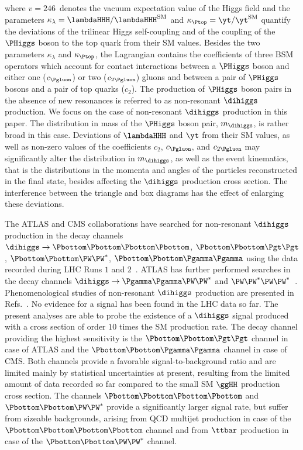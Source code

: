 where $v = 246$~\GeV denotes the vacuum expectation value of the Higgs field
and the parameters $\kappa_{\lambda} = \lambdaHHH/\lambdaHHH^{\textrm{SM}}$ and $\kappa_{\Ptop} = \yt/\yt^{\textrm{SM}}$ 
quantify the deviations of the trilinear Higgs self-coupling and of the coupling of the $\PHiggs$ boson to the top quark from their SM values.
Besides the two parameters $\kappa_{\lambda}$ and $\kappa_{\Ptop}$,
the Lagrangian contains the coefficients of three BSM operators which account for contact interactions 
between a $\PHiggs$ boson and either one ($c_{\Pgluon}$) or two ($c_{2\Pgluon}$) gluons
and between a pair of $\PHiggs$ bosons and a pair of top quarks ($c_{2}$).
The production of $\PHiggs$ boson pairs in the absence of new resonances is referred to as non-resonant $\dihiggs$ production.
We focus on the case of non-resonant $\dihiggs$ production in this paper.
The distribution in mass of the $\PHiggs$ boson pair, $m_{\dihiggs}$, is rather broad in this case.
Deviations of $\lambdaHHH$ and $\yt$ from their SM values,
as well as non-zero values of the coefficients $c_{2}$, $c_{\Pgluon}$, and $c_{2\Pgluon}$
may significantly alter the distribution in $m_{\dihiggs}$,
as well as the event kinematics,
that is the distributions in the momenta and angles of the particles reconstructed in the final state,
besides affecting the $\dihiggs$ production cross section.
The interference between the triangle and box diagrams has the effect of enlarging these deviations.

The ATLAS and CMS collaborations have searched for non-resonant $\dihiggs$ production in the decay channels 
$\dihiggs \to \Pbottom\Pbottom\Pbottom\Pbottom$, $\Pbottom\Pbottom\Pgt\Pgt$, $\Pbottom\Pbottom\PW\PW^{*}$, $\Pbottom\Pbottom\Pgamma\Pgamma$
using the data recorded during LHC Runs $1$ and $2$~\cite{HIG-13-032,HIG-15-013,HIG-17-030,Aad:2015xja,Aaboud:2018knk,Aaboud:2018ftw,Aaboud:2018sfw,Aaboud:2018zhh}.
ATLAS has further performed searches in the decay channels $\dihiggs \to \Pgamma\Pgamma\PW\PW^{*}$ and $\PW\PW^{*}\PW\PW^{*}$~\cite{Aad:2015xja,Aaboud:2018ewm,Aaboud:2018ksn}.
Phenomenological studies of non-resonant $\dihiggs$ production are presented in 
Refs.~\cite{Baur:2002rb,Baur:2002qd,Baur:2003gpa,Baur:2003gp,Dolan:2012rv,Papaefstathiou:2012qe,Baglio:2012np,deLima:2014dta,Wardrope:2014kya,Behr:2015oqq,Li:2015yia,Adhikary:2017jtu}.
No evidence for a signal has been found in the LHC data so far.
The present analyses are able to probe the existence of a $\dihiggs$ signal produced with a cross section of order $10$ times the SM production rate.
The decay channel providing the highest sensitivity is the $\Pbottom\Pbottom\Pgt\Pgt$ channel in case of ATLAS and the $\Pbottom\Pbottom\Pgamma\Pgamma$ channel in case of CMS.
Both channels provide a favorable signal-to-background ratio and are limited mainly by statistical uncertainties at present,
resulting from the limited amount of data recorded so far compared to the small SM $\ggHH$ production cross section.
The channels $\Pbottom\Pbottom\Pbottom\Pbottom$ and $\Pbottom\Pbottom\PW\PW^{*}$ provide a significantly larger signal rate,
but suffer from sizeable backgrounds,
arising from QCD multijet production in case of the $\Pbottom\Pbottom\Pbottom\Pbottom$ channel 
and from $\ttbar$ production in case of the $\Pbottom\Pbottom\PW\PW^{*}$ channel.

